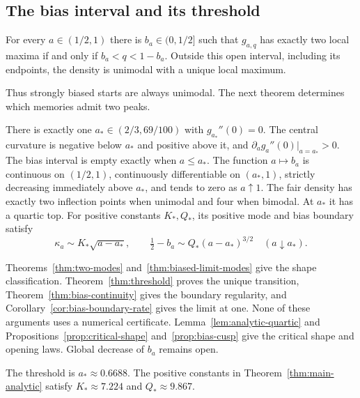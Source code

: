 \subsection{The bias interval and its threshold}\label{sec:results}

\begin{theorem}\label{thm:main-limit}
For every $a\in(1/2,1)$ there is $b_a\in(0,1/2]$ such that
$g_{a,q}$ has exactly two local maxima if and only if
$b_a<q<1-b_a$. Outside this open interval, including its endpoints,
the density is unimodal with a unique local maximum.
\end{theorem}

Thus strongly biased starts are always unimodal. The next theorem
determines which memories admit two peaks.

\begin{theorem}\label{thm:main-analytic}
There is exactly one $a_*\in(2/3,69/100)$ with $g_{a_*}''(0)=0$.
The central curvature is negative below $a_*$ and positive above
it, and $\partial_a g_a''(0)|_{a=a_*}>0$.
The bias interval is empty exactly when $a\le a_*$.
The function $a\mapsto b_a$ is continuous on $(1/2,1)$,
continuously differentiable on $(a_*,1)$, strictly decreasing
immediately above $a_*$, and tends to zero as $a\uparrow1$.
The fair density has exactly two inflection points when unimodal
and four when bimodal. At $a_*$ it has a quartic top. For positive
constants $K_*,Q_*$, its positive mode and bias boundary satisfy
\[
 \kappa_a\sim K_*\sqrt{a-a_*},\qquad
 \tfrac12-b_a\sim Q_*(a-a_*)^{3/2}\quad(a\downarrow a_*).
\]
\end{theorem}

Theorems~\ref{thm:two-modes} and~\ref{thm:biased-limit-modes}
give the shape classification. Theorem~\ref{thm:threshold} proves
the unique transition, Theorem~\ref{thm:bias-continuity} gives the
boundary regularity, and Corollary~\ref{cor:bias-boundary-rate}
gives the limit at one. None of these arguments uses a numerical
certificate. Lemma~\ref{lem:analytic-quartic} and
Propositions~\ref{prop:critical-shape} and~\ref{prop:bias-cusp}
give the critical shape and opening laws. Global decrease of $b_a$ remains open.

\begin{proposition}\label{thm:main-threshold}
The threshold is $a_*\approx0.6688$. The positive constants in
Theorem~\ref{thm:main-analytic} satisfy
$K_*\approx7.224$ and $Q_*\approx9.867$.
\end{proposition}

